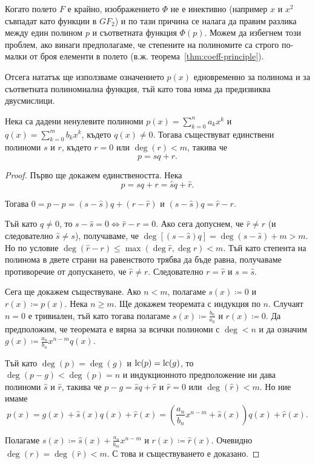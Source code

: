 \documentclass[numbers=endperiod, DIV=15]{scrartcl}
\begin{document}
Когато полето $F$ е крайно, изображението $\Phi$ не е инективно (например $x$ и $x^2$ съвпадат като функции в $GF_2$) и по тази причина се налага да правим разлика между един полином $p$ и съответната функция $\Phi(p)$. Можем да избегнем този проблем, ако винаги предполагаме, че степените на полиномите са строго по-малки от броя елементи в полето (в.ж. теорема~\ref{thm:coeff-principle}).

Отсега нататък ще използваме означението $p(x)$ едновременно за полинома и за съответната полиномиална функция, тъй като това няма да предизвиква двусмислици.

\begin{theorem}
  Нека са дадени ненулевите полиноми $p(x) = \sum_{k=0}^n a_k x^k$ и $q(x) = \sum_{k=0}^m b_k x^k$, където $q(x) \neq 0$. Тогава съществуват единствени полиноми $s$ и $r$, където $r = 0$ или $\deg(r) < m$, такива че
  \begin{displaymath}
    p = sq + r.
  \end{displaymath}
\end{theorem}
\begin{proof}
  Първо ще докажем единствеността. Нека
  \begin{displaymath}
    p = sq + r = \hat sq + \hat r.
  \end{displaymath}

  Тогава $0 = p - p = (s - \hat s) q + (r - \hat r)$ и $(s - \hat s) q = \hat r - r$.

  Тъй като $q \neq 0$, то $s - \hat s = 0 \iff \hat r - r = 0$. Ако сега допуснем, че $\hat r \neq r$ (и следователно $\hat s \neq s$), получаваме, че $\deg[(s - \hat s) q] = \deg(s - \hat s) + m > m$. Но по условие $\deg(\hat r - r) \leq \max(\deg \hat r, \deg r) < m$. Тъй като степента на полинома в двете страни на равенството трябва да бъде равна, получаваме противоречие от допускането, че $\hat r \neq r$. Следователно $r = \hat r$ и $s = \hat s$.

  Сега ще докажем съществуване. Ако $n < m$, полагаме $s(x) \coloneqq 0$ и $r(x) \coloneqq p(x)$. Нека $n \geq m$. Ще докажем теоремата с индукция по $n$. Случаят $n = 0$ е тривиален, тъй като тогава полагаме $s(x) \coloneqq \frac {b_0} {a_0}$ и $r(x) \coloneqq 0$. Да предположим, че теоремата е вярна за всички полиноми с $\deg < n$ и да означим $g(x) \coloneqq \frac {a_n} {b_n} x^{n-m} q(x)$.

  Тъй като $\deg(p) = \deg(g)$ и $\operatorname{lc}(p) = \operatorname{lc}(g)$, то $\deg(p - g) < \deg(p) = n$ и индукционното предположение ни дава полиноми $\hat s$ и $\hat r$, такива че $p - g = \hat s q + \hat r$ и $\hat r = 0$ или $\deg(\hat r) < m$. Но ние имаме
  \begin{displaymath}
    p(x)
    =
    g(x) + \hat s(x) q(x) + \hat r(x)
    =
    \left( \frac {a_n} {b_n} x^{n-m} + \hat s(x) \right) q(x) + \hat r(x).
  \end{displaymath}

  Полагаме $s(x) \coloneqq \hat s(x) + \frac {a_n} {b_m} x^{n-m}$ и $r(x) \coloneqq \hat r(x)$. Очевидно $\deg(r) = \deg(\hat r) < m$. С това и съществуването е доказано.
\end{proof}
\end{document}
